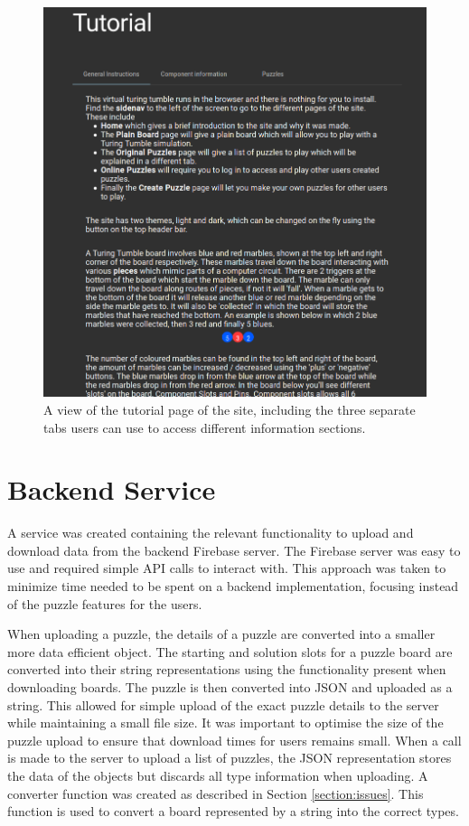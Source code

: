 \documentclass{l4proj}
\begin{document}
\begin{figure}
    \centering
    \includegraphics[width=0.65\linewidth]{images/tutorial.png}
    \caption{A view of the tutorial page of the site, including the three separate tabs users can use to access different information sections.}
    \label{fig:tutorial}
\end{figure}


\section{Backend Service}
A service was created containing the relevant functionality to upload and download data from the backend Firebase server. The Firebase server was easy to use and required simple API calls to interact with. This approach was taken to minimize time needed to be spent on a backend implementation, focusing instead of the puzzle features for the users. 


When uploading a puzzle, the details of a puzzle are converted into a smaller more data efficient object. The starting and solution slots for a puzzle board are converted into their string representations using the functionality present when downloading boards. The puzzle is then converted into JSON and uploaded as a string. This allowed for simple upload of the exact puzzle details to the server while maintaining a small file size. It was important to optimise the size of the puzzle upload to ensure that download times for users remains small. When a call is made to the server to upload a list of puzzles, the JSON representation stores the data of the objects but discards all type information when uploading. A converter function was created as described in Section \ref{section:issues}. This function is used to convert a board represented by a string into the correct types.
\end{document}
